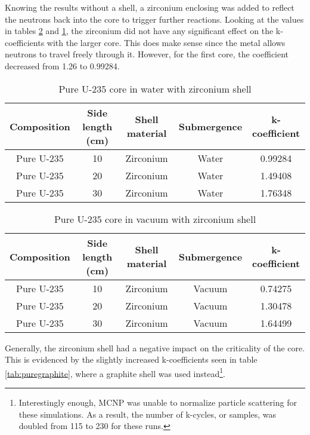 Knowing the results without a shell, a zirconium enclosing was added to reflect the neutrons back into the core to trigger further reactions. Looking at the values in tables \ref{tab:purezrv} and \ref{tab:purezrw}, the zirconium did not have any significant effect on the k-coefficients with the larger core. This does make sense since the metal allows neutrons to travel freely through it. However, for the first core, the coefficient decreased from 1.26 to 0.99284.
\begin{table}[!htbp]
\centering
\caption{Pure U-235 core in water with zirconium shell}
\label{tab:purezrw}
\begin{tabular}{|c|c|c|c|c|}
\hline
Composition & Side length (cm) & Shell material & Submergence & k-coefficient \\
\hline
Pure U-235  & 10               & Zirconium            & Water       & 0.99284      \\
\hline
Pure U-235  & 20               & Zirconium            & Water       & 1.49408       \\
\hline
Pure U-235  & 30               & Zirconium            & Water       & 1.76348       \\
\hline
\end{tabular}
\end{table}
\begin{table}[!htbp]
\centering
\caption{Pure U-235 core in vacuum with zirconium shell}
\label{tab:purezrv}
\begin{tabular}{|c|c|c|c|c|}
\hline
Composition & Side length (cm) & Shell material & Submergence & k-coefficient \\
\hline
Pure U-235  & 10               & Zirconium            & Vacuum       & 0.74275      \\
\hline
Pure U-235  & 20               & Zirconium            & Vacuum       & 1.30478       \\
\hline
Pure U-235  & 30               & Zirconium            & Vacuum       & 1.64499       \\
\hline
\end{tabular}
\end{table}
Generally, the zirconium shell had a negative impact on the criticality of the core. This is evidenced by the slightly increased k-coefficients seen in table \ref{tab:puregraphite}, where a graphite shell was used instead\footnote{Interestingly enough, MCNP was unable to normalize particle scattering for these simulations. As a result, the number of k-cycles, or samples, was doubled from 115 to 230 for these runs.}.
